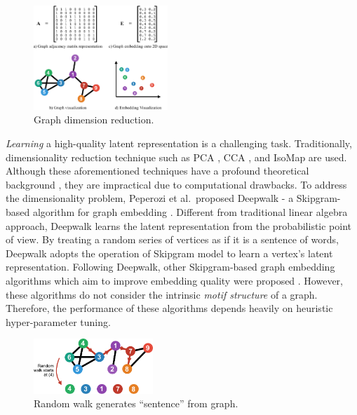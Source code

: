 \documentclass[letterpaper]{article}
\begin{document}
        \begin{figure}
            \centering
            \includegraphics[width=0.45\textwidth]{fig1_dimrec}
            \caption{Graph dimension reduction.}
            \label{fig:dimrec}
        \end{figure}

        \emph{Learning} a high-quality latent representation is a challenging task. Traditionally,
        dimensionality reduction technique such as PCA \cite{pca}, CCA \cite{cca}, and IsoMap 
        \cite{isomap} are used. Although these aforementioned techniques have a profound theoretical
        background \cite{dimrecrev}, they are impractical due to computational drawbacks. To address
        the dimensionality problem, Peperozi et al.\ proposed Deepwalk - a Skipgram-based algorithm
        for graph embedding \cite{deepwalk}. Different from traditional linear algebra approach,
        Deepwalk learns the latent representation from the probabilistic point of view. By treating
        a random series of vertices as if it is a sentence of words, Deepwalk adopts the operation
        of Skipgram model \cite{skipgram} to learn a vertex's latent representation. Following
        Deepwalk, other Skipgram-based graph embedding algorithms which aim to improve embedding
        quality were proposed \cite{grarep,line,planetoid,node2vec}. However, these algorithms
        do not consider the intrinsic \emph{motif structure} of a graph. Therefore, the performance
        of these algorithms depends heavily on heuristic hyper-parameter tuning.

        \begin{figure}
            \centering
            \includegraphics[width=0.4\textwidth]{fig2_congen}
            \caption{Random walk generates ``sentence'' from graph.}
            \label{fig:congen}
        \end{figure}
\end{document}
